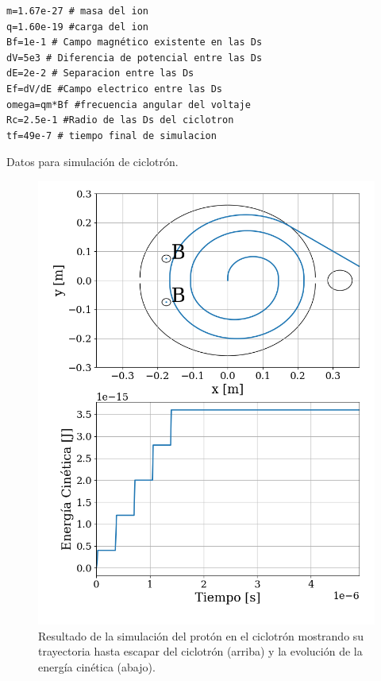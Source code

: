 \documentclass[journal]{IEEEtran}
\newenvironment{code}{\captionsetup{type=listing}}{\par\addvspace{\baselineskip}}
\begin{document}
\begin{code}
    \begin{verbatim}
m=1.67e-27 # masa del ion
q=1.60e-19 #carga del ion
Bf=1e-1 # Campo magnético existente en las Ds
dV=5e3 # Diferencia de potencial entre las Ds
dE=2e-2 # Separacion entre las Ds 
Ef=dV/dE #Campo electrico entre las Ds
omega=qm*Bf #frecuencia angular del voltaje
Rc=2.5e-1 #Radio de las Ds del ciclotron
tf=49e-7 # tiempo final de simulacion
    \end{verbatim}
    \caption{Datos para simulación de ciclotrón.}
    \label{listing:ciclotron_datos}
\end{code}

\begin{figure}[!htb]
    \centering
    \includegraphics[width=\linewidth]{ciclotron_simulacion.png}
    \caption{Resultado de la simulación del protón en el ciclotrón mostrando su trayectoria hasta escapar del ciclotrón (arriba) y la evolución de la energía cinética (abajo).}
    \label{fig:ciclotron_simulacion}
\end{figure}
\end{document}
